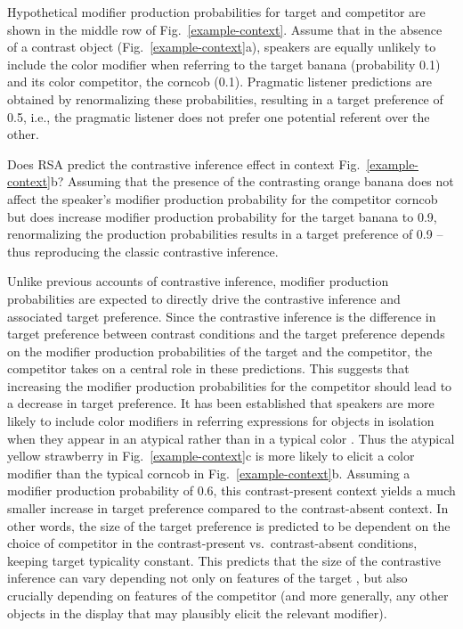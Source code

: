 \documentclass[10pt,letterpaper]{article}
\newcommand{\figref}[1]{Fig.~\ref{#1}}
\begin{document}
Hypothetical modifier production probabilities for target and competitor are shown in the middle row of \figref{example-context}. 
Assume that in the absence of a contrast object (\figref{example-context}a), speakers are equally unlikely to include the color modifier when referring to the target banana (probability 0.1) and its color competitor, the corncob (0.1). Pragmatic listener predictions are obtained by renormalizing these probabilities, resulting in a target preference of 0.5, i.e., the pragmatic listener does not prefer one potential referent over the other.

Does RSA predict the contrastive inference effect in context \figref{example-context}b? Assuming that the presence of the contrasting orange banana does not affect the speaker's modifier production probability for the competitor corncob but does increase modifier production probability for the target banana to 0.9, renormalizing the production probabilities results in a target preference of 0.9 -- thus reproducing the classic contrastive inference.

Unlike previous accounts of contrastive inference, modifier production probabilities are expected to directly drive the contrastive inference and associated target preference. Since the contrastive inference is the difference in target preference between contrast conditions and the target preference depends on the modifier production probabilities of the target and the competitor, the competitor takes on a central role in these predictions. This suggests that increasing the modifier production probabilities for the competitor should lead to a decrease in target preference. It has been established that speakers are more likely to include color modifiers in referring expressions for objects in isolation when they appear in an atypical rather than in a typical color \cite{Rubio-Fernandez:2016,Westerbeek:2015,Degen:2020}. Thus the atypical yellow strawberry in \figref{example-context}c is more likely to elicit a color modifier than the typical corncob in \figref{example-context}b. Assuming a modifier production probability of 0.6, this contrast-present context yields a much smaller increase in target preference compared to the contrast-absent context. In other words, the size of the target preference is predicted to be dependent on the choice of competitor in the contrast-present vs.~contrast-absent conditions, keeping target typicality constant. This predicts that the size of the contrastive inference can vary depending not only on features of the target \cite<as previously shown by>{Sedivy:2003, Rubio-Fernandez:2019}, but also crucially depending on features of the competitor (and more generally, any other objects in the display that may plausibly elicit the relevant modifier).
\end{document}
